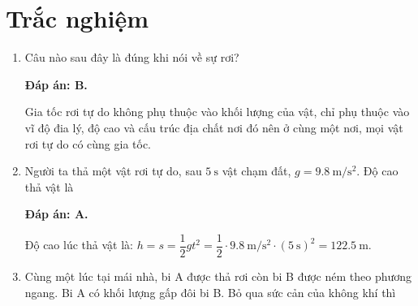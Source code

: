 
\setcounter{section}{0}
\section{Trắc nghiệm}
\begin{enumerate}[label=\bfseries Câu \arabic*:]
	
	\item {}
	
	
	{Câu nào sau đây là đúng khi nói về sự rơi?
	}
	
	\hideall
	{	\textbf{Đáp án: B.}
		
		Gia tốc rơi tự do không phụ thuộc vào khối lượng của vật, chỉ phụ thuộc vào vĩ độ đia lý, độ cao và cấu trúc địa chất nơi đó nên ở cùng một nơi, mọi vật rơi tự do có cùng gia tốc.
	}
	
	\item {}
	
	
	{Người ta thả một vật rơi tự do, sau $\SI{5}{\second}$ vật chạm đất, $g=\SI{9.8}{\meter/\second^2}$. Độ cao thả vật là
	}
	\hideall
	{	\textbf{Đáp án: A.}	
		
		Độ cao lúc thả vật là:
		$h=s=\dfrac{1}{2}gt^2=\dfrac{1}{2}\cdot\SI{9.8}{\meter/\second^2}\cdot(\SI{5}{\second})^2=\SI{122.5}{\meter}.$
	}
	\item {}
	
	
	{Cùng một lúc tại mái nhà, bi A được thả rơi còn bi B được ném theo phương ngang. Bi A có khối lượng gấp đôi bi B. Bỏ qua sức cản của không khí thì
		
}
\end{enumerate}
